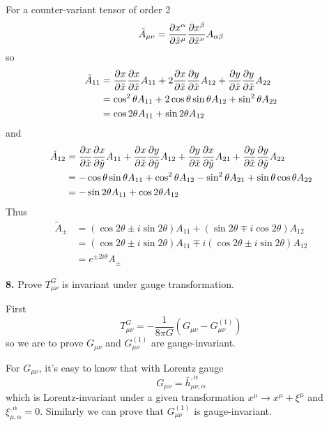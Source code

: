 \documentclass{article}
\renewcommand{\a}{\alpha}
\renewcommand{\b}{\beta}
\newcommand{\tx}{\tilde x}
\newcommand{\hb}{\bar h}
\begin{document}
For a counter-variant tensor of order 2
$$\tilde A_{\mu\nu}=\pdv{x^{\a}}{\tilde x^{\mu}}\pdv{x^{\b}}{\tilde x^{\nu}}A_{\a\b}$$
so
\begin{align*}
  \tilde A_{11}&=\pdv{x}{\tilde x}\pdv{x}{\tilde x}A_{11}+2\pdv{x}{\tilde x}\pdv{y}{\tilde x}A_{12}+\pdv{y}{\tilde x}\pdv{y}{\tx}A_{22}\\
  &=\cos^2\theta A_{11}+2\cos\theta\sin\theta A_{12}+\sin^2\theta A_{22}\\
  &=\cos2\theta A_{11}+\sin2\theta A_{12}
\end{align*}
and
\begin{align*}
  \tilde A_{12}&=\pdv{x}{\tilde x}\pdv{x}{\tilde y}A_{11}+\pdv{x}{\tx}\pdv{y}{\tilde y}A_{12}+\pdv{y}{\tx}\pdv{x}{\tilde y}A_{21}+\pdv{y}{\tx}\pdv{y}{\tilde y}A_{22}\\
  &=-\cos\theta\sin\theta A_{11}+\cos^2\theta A_{12}-\sin^2\theta A_{21}+\sin\theta\cos\theta A_{22}\\
  &=-\sin2\theta A_{11}+\cos2\theta A_{12}
\end{align*}
Thus
\begin{align*}
  \tilde A_{\pm}&=(\cos2\theta\pm i\sin2\theta)A_{11}+(\sin2\theta \mp i\cos2\theta)A_{12}\\
  &=(\cos2\theta\pm i\sin2\theta)A_{11}\mp i(\cos2\theta\pm i\sin2\theta)A_{12}\\
  &=e^{\pm2i\theta}A_{\pm}
\end{align*}

{\bf8.}\quad
Prove $T^{G}_{\mu\nu}$ is invariant under gauge transformation.

First
$$T^G_{\mu\nu}=-\frac{1}{8\pi G}(G_{\mu\nu}-G^{(1)}_{\mu\nu})$$
so we are to prove $G_{\mu\nu}$ and $G^{(1)}_{\mu\nu}$ are gauge-invariant.

For $G_{\mu\nu}$, it's easy to know that with Lorentz gauge
$$G_{\mu\nu}=\hb^{,\a}_{\mu\nu,\a}$$
which is Lorentz-invariant under a given transformation $x^{\mu}\rightarrow x^{\mu}+\xi^{\mu}$ and $\xi^{,\a}_{\mu,\a}=0$. Similarly we can prove that $G^{(1)}_{\mu\nu}$ is gauge-invariant.
\end{document}

